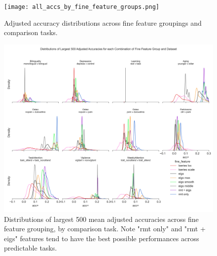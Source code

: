 \documentclass{article}  %
\begin{document}




\begin{figure}[H]
\begin{center}
\texttt{[image: all\_accs\_by\_fine\_feature\_groups.png]}
\end{center}
\caption
{ \label{fig:feature-group-all-acc} Adjusted accuracy distributions across
fine feature groupings and comparison tasks.}
\end{figure}





\begin{figure}[H]
\begin{center}
\includegraphics[width=\textwidth,height=0.9\textheight,keepaspectratio]{fine_feature_largest_accs_by_subgroup.png}
\end{center}
\caption
{ \label{fig:fine-largest-acc} Distributions of largest 500 mean adjusted
accuracies across fine feature grouping, by comparison task. Note "rmt only"
and "rmt + eigs" features tend to have the best possible performances across
predictable tasks. }
\end{figure}
\end{document}

